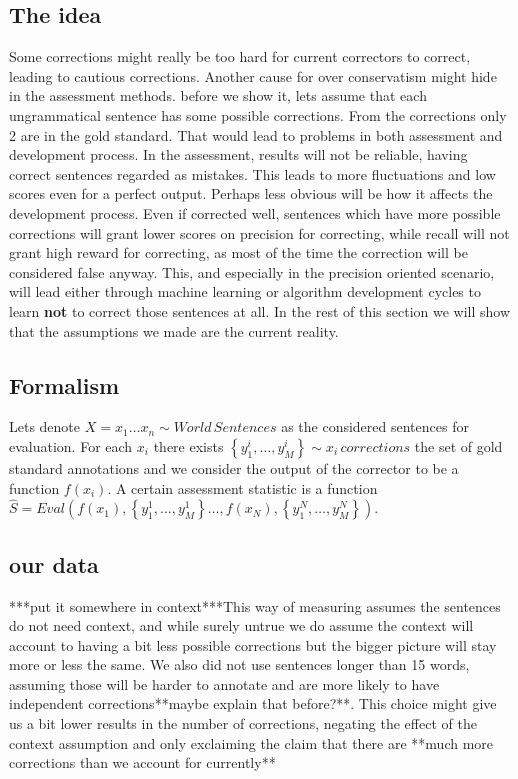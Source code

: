 \documentclass[english]{article}
\begin{document}
\subsection{The idea}

Some corrections might really be too hard for current correctors to
correct, leading to cautious corrections. Another cause for over conservatism
might hide in the assessment methods. before we show it, lets assume
that each ungrammatical sentence has some possible corrections. From
the corrections only 2 are in the gold standard. That would lead to
problems in both assessment and development process. In the assessment,
results will not be reliable, having correct sentences regarded as mistakes. This leads to more fluctuations and low scores even for a perfect output.
Perhaps less obvious will be how it affects the development
process. Even if corrected well, sentences which have more possible
corrections will grant lower scores on precision for correcting, while recall will not grant high reward for correcting, as most of the time the correction will be considered false anyway. This, and especially in the precision oriented scenario, will lead either through
machine learning or algorithm development cycles to learn \textbf{not} to correct
those sentences at all. In the rest of this section we will show that
the assumptions we made are the current reality.

\subsection{Formalism}

Lets denote $X=x_{1}\ldots x_{n}\sim World\,Sentences$ as the considered
sentences for evaluation. For each $x_{i}$ there exists $\left\{ y_{1}^{i},\ldots,y_{M}^{i}\right\} \sim x_{i}\,corrections$
the set of gold standard annotations and we consider the output of
the corrector to be a function $f\left(x_{i}\right)$. A certain assessment
statistic is a function $\hat{S}=Eval\left(f\left(x_{1}\right),\left\{ y_{1}^{1},\ldots,y_{M}^{1}\right\} \ldots,f\left(x_{N}\right),\left\{ y_{1}^{N},\ldots,y_{M}^{N}\right\} \right)$.

\subsection{our data}

{*}{*}{*}put it somewhere in context{*}{*}{*}This way of measuring
assumes the sentences do not need context, and while surely untrue
we do assume the context will account to having a bit less possible
corrections but the bigger picture will stay more or less the same.
We also did not use sentences longer than 15 words, assuming those
will be harder to annotate and are more likely to have independent
corrections{*}{*}maybe explain that before?{*}{*}. This choice might
give us a bit lower results in the number of corrections, negating
the effect of the context assumption and only exclaiming the claim
that there are {*}{*}much more corrections than we account for currently{*}{*}
\end{document}
